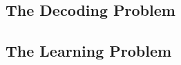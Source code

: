 \documentclass[11pt, a4paper]{article}
\begin{document}
\subsection{The Decoding Problem}

\subsection{The Learning Problem}
\end{document}
